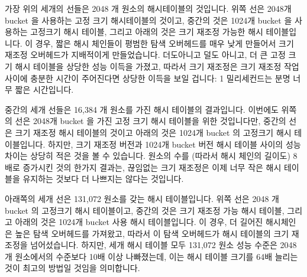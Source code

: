 가장 위의 세개의 선들은 2048 개 원소의 해시테이블의 것입니다.
위쪽 선은 2048개 bucket 을 사용하는 고정 크기 해시테이블의 것이고, 중간의 것은
1024개 bucket 을 사용하는 고정크기 해시 테이블, 그리고 아래의 것은 크기 재조정
가능한 해시 테이블입니다.
이 경우, 짧은 해시 체인들이 평범한 탐색 오버헤드를 매우 낮게 만들어서 크기
재조정 오버헤드가 지배적이게 만들었습니다.
더도아니고 덜도 아니고, 더 큰 고정 크기 해시 테이블을 상당한 성능 이득을
가졌고, 따라서 크기 재조정은 크기 재조정 작업 사이에 충분한 시간이 주어진다면
상당한 이득을 보일 겁니다: 1 밀리세컨드는 분명 너무 짧은 시간입니다.

중간의 세개 선들은 16,384 개 원소를 가진 해시 테이블의 결과입니다.
이번에도 위쪽의 선은 2048개 bucket 을 가진 고정 크기 해시 테이블을 위한
것입니다만, 중간의 선은 크기 재조정 해시 테이블의 것이고 아래의 것은 1024개
bucket 의 고정크기 해시 테이블입니다.
하지만, 크기 재조정 버전과 1024개 bucket 버전 해시 테이블 사이의 성능 차이는
상당히 적은 것을 볼 수 있습니다.
원소의 수를 (따라서 해시 체인의 길이도) 8배로 증가시킨 것의 한가지 결과는,
끊임없는 크기 재조정은 이제 너무 작은 해시 테이블을 유지하는 것보다 더 나쁘지는
않다는 것입니다.

아래쪽의 세개 선은 131,072 원소를 갖는 해시 테이블입니다.
위쪽 선은 2048 개 bucket 의 고정크기 해시 테이블이고,
중간의 것은 크기 재조정 가능 해시 테이블, 그리고 아래의 것은 1024개 bucket 사용
해시 테이블입니다.
이 경우, 더 길어진 해시체인은 높은 탐색 오버헤드를 가져왔고, 따라서 이 탐색
오버헤드가 해시 테이블의 크기 재조정을 넘어섰습니다.
하지만, 세개 해시 테이블 모두 131,072 원소 성능 수준은 2048개 원소에서의
수준보다 10배 이상 나빠졌는데, 이는 해시 테이블 크기를 64배 늘리는 것이 최고의
방법일 것임을 의미합니다.
\iffalse

